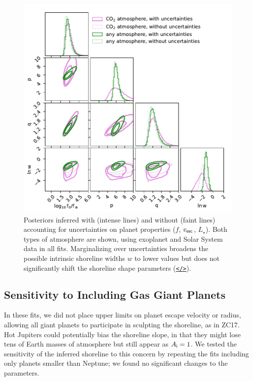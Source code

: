 \documentclass[modern,linenumbers,trackchanges]{aastex7}
\begin{document}
\begin{figure}[ht!]
\includegraphics[width=\textwidth]{figures/posteriors-with-and-without-uncertainties.pdf}
\caption{Posteriors inferred with (intense lines) and without (faint lines) accounting for uncertainties on planet properties ($f$, $v_{\sf esc}$, $L_\star$). Both types of atmosphere are shown, using exoplanet and Solar System data in all fits. Marginalizing over uncertainties broadens the possible intrinsic shoreline widths $w$ to lower values but does not significantly shift the shoreline shape parameters (\href{https://github.com/zkbt/shoreline/blob/main/notebooks/print-and-visualize-posteriors.ipynb}{\texttt{</>}}).}
\label{f:posteriors-uncertainties}
\end{figure}


\subsection{Sensitivity to Including Gas Giant Planets}
In these fits, we did not place upper limits on planet escape velocity or radius, allowing all giant planets to participate in sculpting the shoreline, as in ZC17. Hot Jupiters could potentially bias the shoreline slope, in that they might lose tens of Earth masses of atmosphere but still appear as $A_{\sf i} = 1$. We tested the sensitivity of the inferred shoreline to this concern by repeating the fits including only planets smaller than Neptune; we found no significant changes to the parameters. 
\end{document}
